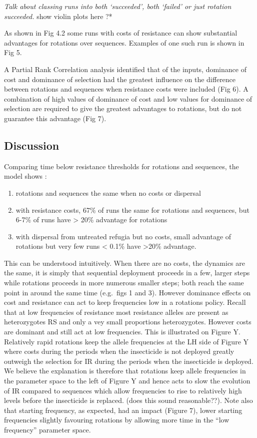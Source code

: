 \documentclass[11pt,]{article}
\providecommand{\tightlist}{%
  \setlength{\itemsep}{0pt}\setlength{\parskip}{0pt}}
\begin{document}
\emph{Talk about classing runs into both `succeeded', both `failed' or
just rotation succeeded. }show violin plots here ?*

As shown in Fig 4.2 some runs with costs of resistance can show
substantial advantages for rotations over sequences. Examples of one
such run is shown in Fig 5.

A Partial Rank Correlation analysis identified that of the inputs,
dominance of cost and dominance of selection had the greatest influence
on the difference between rotations and sequences when resistance costs
were included (Fig 6). A combination of high values of dominance of cost
and low values for dominance of selection are required to give the
greatest advantages to rotations, but do not guarantee this advantage
(Fig 7).

\subsection{Discussion}\label{discussion}

Comparing time below resistance thresholds for rotations and sequences,
the model shows :

\begin{enumerate}
\def\labelenumi{\arabic{enumi}.}
\tightlist
\item
  rotations and sequences the same when no costs or dispersal
\item
  with resistance costs, 67\% of runs the same for rotations and
  sequences, but 6-7\% of runs have \textgreater{} 20\% advantage for
  rotations
\item
  with dispersal from untreated refugia but no costs, small advantage of
  rotations but very few runs \textless{} 0.1\% have \textgreater{}20\%
  advantage.
\end{enumerate}

This can be understood intuitively. When there are no costs, the
dynamics are the same, it is simply that sequential deployment proceeds
in a few, larger steps while rotations proceeds in more numerous smaller
steps; both reach the same point in around the same time (e.g.~figs 1
and 3). However dominance effects on cost and resistance can act to keep
frequencies low in a rotations policy. Recall that at low frequencies of
resistance most resistance alleles are present as heterozygotes RS and
only a vey small proportions heterozygotes. However costs are dominant
and still act at low frequencies. This is illustrated on Figure Y.
Relatively rapid rotations keep the allele frequencies at the LH side of
Figure Y where costs during the periods when the insecticide is not
deployed greatly outweigh the selection for IR during the periods when
the insecticide is deployed. We believe the explanation is therefore
that rotations keep allele frequencies in the parameter space to the
left of Figure Y and hence acts to slow the evolution of IR compared to
sequences which allow frequencies to rise to relatively high levels
before the insecticide is replaced. (does this sound reasonable??). Note
also that starting frequency, as expected, had an impact (Figure 7),
lower starting frequencies slightly favouring rotations by allowing more
time in the ``low frequency'' parameter space.
\end{document}
